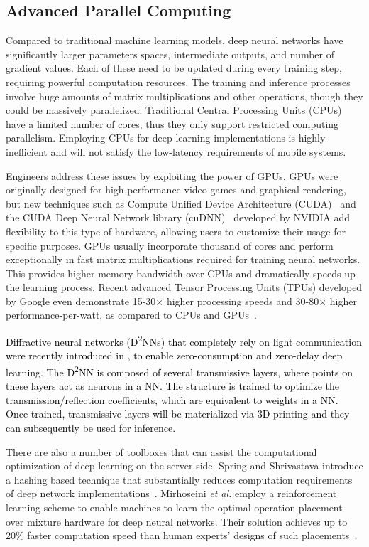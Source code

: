 \documentclass[journal,comsoc,letter]{IEEEtran}
\newcommand{\edit}[1]{\textcolor{black}{#1}}
\begin{document}
\subsection{Advanced Parallel Computing}
Compared to traditional machine learning models, deep neural networks have significantly larger parameters spaces, intermediate outputs, and number of gradient values. Each of these need to be updated during every training step, requiring powerful computation resources. The training and inference processes involve huge amounts of matrix multiplications and other operations, though they could be massively parallelized. Traditional Central Processing Units (CPUs) have a limited number of cores, thus they only support restricted computing parallelism. Employing CPUs for deep learning implementations is highly inefficient and will not satisfy the low-latency requirements of mobile systems. 

Engineers address these issues by exploiting the power of GPUs. GPUs were originally designed for high performance video games and graphical rendering, but new techniques such as Compute Unified Device Architecture (CUDA)~\cite{nickolls2008scalable} and the CUDA Deep Neural Network library (cuDNN)~\cite{chetlur2014cudnn} developed by NVIDIA add flexibility to this type of hardware, allowing users to customize their usage for specific purposes. GPUs usually incorporate thousand of cores and perform exceptionally in fast matrix multiplications required for training neural networks. This provides higher memory bandwidth over CPUs and dramatically speeds up the learning process. Recent advanced Tensor Processing Units (TPUs) developed by Google even demonstrate 15-30$\times$ higher processing speeds and 30-80$\times$ higher performance-per-watt, as compared to CPUs and GPUs~\cite{jouppi2017datacenter}. 

\edit{Diffractive neural networks (D\textsuperscript{2}NNs) that completely rely on light communication were recently introduced in \cite{Lineaat8084}, to enable zero-consumption and zero-delay deep learning. The D\textsuperscript{2}NN is composed of several transmissive layers, where points on these layers act as neurons in a NN. The structure is trained to optimize the transmission/reflection coefficients, which are equivalent to weights in a NN. Once trained, transmissive layers will be materialized via 3D printing and they can subsequently be used for inference.}

There are also a number of toolboxes that can assist the computational optimization of deep learning on the server side. Spring and Shrivastava introduce a hashing based technique that substantially reduces computation requirements of deep network implementations~\cite{spring2017scalable}. Mirhoseini \emph{et al.} employ a reinforcement learning scheme to enable machines to learn the optimal operation placement over mixture hardware for deep neural networks.  Their solution achieves up to 20\% faster computation speed than human experts' designs of such placements~\cite{mirhoseini2017device}.
\end{document}
